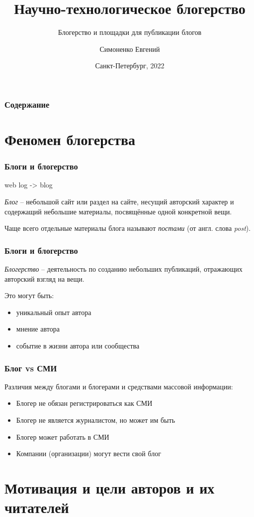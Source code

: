 \documentclass[14pt]{beamer}
\title[Блогерство]{Научно-технологическое блогерство}
\subtitle{Блогерство и площадки для публикации блогов}
\author[]{Симоненко Евгений}
\institute[]{Университет ИТМО}
\date[]{Санкт-Петербург, 2022}
\begin{document}
\begin{frame}
  \titlepage
\end{frame}

\begin{frame}
  \frametitle{Содержание}
  \tableofcontents
\end{frame}

\section{Феномен блогерства}

\begin{frame}
  \frametitle{Блоги и блогерство}
  web log -> blog

  \emph{Блог} -- небольшой сайт или раздел на сайте, несущий авторский
  характер и содержащий небольшие материалы, посвящённые одной конкретной
  вещи.

  Чаще всего отдельные материалы блога называют \emph{постами} (от англ. слова \textit{post}).
\end{frame}

\begin{frame}
  \frametitle{Блоги и блогерство}
  \emph{Блогерство} -- деятельность по созданию небольших публикаций,
  отражающих авторский взгляд на вещи.

  Это могут быть:
  \begin{itemize}
  \item уникальный опыт автора
  \item мнение автора
  \item событие в жизни автора или сообщества
  \end{itemize}
\end{frame}

\begin{frame}
  \frametitle{Блог vs СМИ}
  Различия между блогами и блогерами и средствами массовой информации:
  \begin{itemize}
  \item Блогер не обязан регистрироваться как СМИ
  \item Блогер не является журналистом, но может им быть
  \item Блогер может работать в СМИ
  \item Компании (организации) могут вести свой блог
  \end{itemize}
\end{frame}

\section{Мотивация и цели авторов и их читателей}
\end{document}
